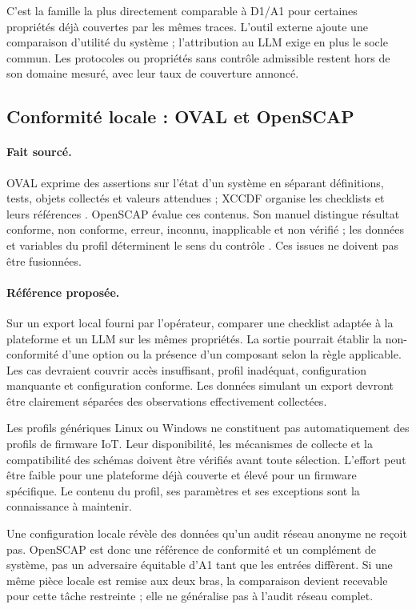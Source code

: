 \documentclass[11pt,a4paper]{article}
\begin{document}
C'est la famille la plus directement comparable à D1/A1 pour certaines propriétés déjà couvertes par les mêmes traces. L'outil externe ajoute une comparaison d'utilité du système ; l'attribution au LLM exige en plus le socle commun. Les protocoles ou propriétés sans contrôle admissible restent hors de son domaine mesuré, avec leur taux de couverture annoncé.

\subsection{Conformité locale : OVAL et OpenSCAP}
\paragraph{Fait sourcé.}
OVAL exprime des assertions sur l'état d'un système en séparant définitions, tests, objets collectés et valeurs attendues ; XCCDF organise les checklists et leurs références \cite{oval}. OpenSCAP évalue ces contenus. Son manuel distingue résultat conforme, non conforme, erreur, inconnu, inapplicable et non vérifié ; les données et variables du profil déterminent le sens du contrôle \cite{openscap}. Ces issues ne doivent pas être fusionnées.

\paragraph{Référence proposée.}
Sur un export local fourni par l'opérateur, comparer une checklist adaptée à la plateforme et un LLM sur les mêmes propriétés. La sortie pourrait établir la non-conformité d'une option ou la présence d'un composant selon la règle applicable. Les cas devraient couvrir accès insuffisant, profil inadéquat, configuration manquante et configuration conforme. Les données simulant un export devront être clairement séparées des observations effectivement collectées.

Les profils génériques Linux ou Windows ne constituent pas automatiquement des profils de firmware IoT. Leur disponibilité, les mécanismes de collecte et la compatibilité des schémas doivent être vérifiés avant toute sélection. L'effort peut être faible pour une plateforme déjà couverte et élevé pour un firmware spécifique. Le contenu du profil, ses paramètres et ses exceptions sont la connaissance à maintenir.

Une configuration locale révèle des données qu'un audit réseau anonyme ne reçoit pas. OpenSCAP est donc une référence de conformité et un complément de système, pas un adversaire équitable d'A1 tant que les entrées diffèrent. Si une même pièce locale est remise aux deux bras, la comparaison devient recevable pour cette tâche restreinte ; elle ne généralise pas à l'audit réseau complet.
\end{document}
